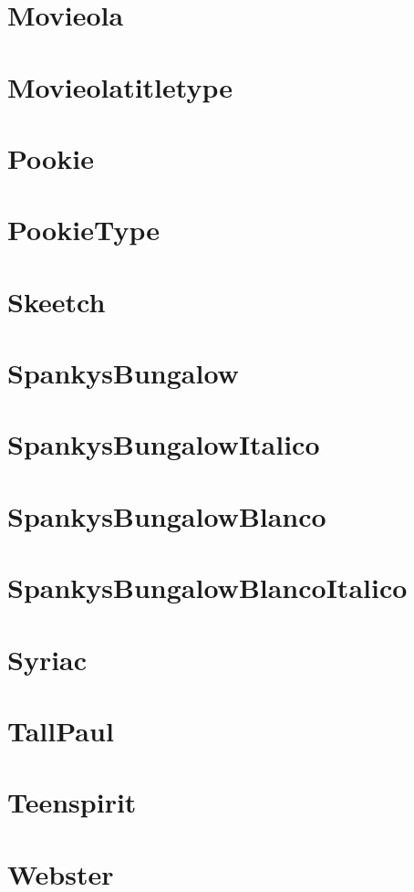 \documentclass{article}
\begin{document}
\section{Movieola}                      {\ECFMovieola\lipsum[4]}
\section{Movieolatitletype}             {\ECFMovieolaTitleType\lipsum[4]}
\section{Pookie}                        {\ECFPookie\lipsum[4]}
\section{PookieType}                    {\ECFPookieType\lipsum[4]}
\section{Skeetch}                       {\ECFSkeetch\lipsum[4]}
\section{SpankysBungalow}               {\ECFSpankysBungalow\lipsum[4]}
\section{SpankysBungalowItalico}        {\ECFSpankysBungalowItalico\lipsum[4]}
\section{SpankysBungalowBlanco}         {\ECFSpankysBungalowBlanco\lipsum[4]}
\section{SpankysBungalowBlancoItalico}  {\ECFSpankysBungalowBlancoItalico\lipsum[4]}
\section{Syriac}                        {\ECFSyriac\lipsum[4]}
\section{TallPaul}                      {\ECFTallPaul\lipsum[4]}
\section{Teenspirit}                    {\ECFTeenSpirit\lipsum[4]}
\section{Webster}                       {\ECFWebster\lipsum[4]}
\end{document}
